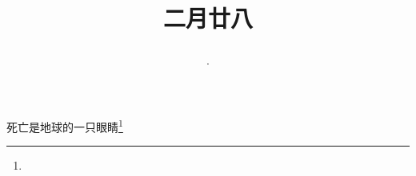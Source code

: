 \title{\date[d=6,m=4,y=2024][year:cn-y,年,month:cn,day:cn,日,·,weekday]·二月廿八 }
死亡是地球的一只眼睛\footnote{ }

